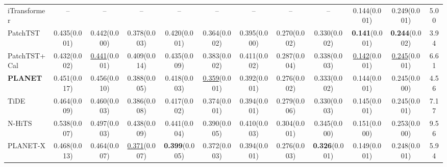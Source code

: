 \begin{table}[!t]
\begin{adjustbox}{max width=\linewidth}
\begin{tabular}{lccccccccccc}
iTransformer & -- & -- & -- & -- & -- & -- & -- & -- & 0.144{\scriptsize\color{gray}(0.001)} & 0.249{\scriptsize\color{gray}(0.001)} & 5.00 \\
PatchTST & 0.435{\scriptsize\color{gray}(0.001)} & 0.442{\scriptsize\color{gray}(0.000)} & 0.378{\scriptsize\color{gray}(0.003)} & 0.420{\scriptsize\color{gray}(0.001)} & 0.364{\scriptsize\color{gray}(0.002)} & 0.395{\scriptsize\color{gray}(0.000)} & 0.270{\scriptsize\color{gray}(0.002)} & 0.330{\scriptsize\color{gray}(0.002)} & \textbf{0.141}{\scriptsize\color{gray}(0.001)} & \textbf{0.244}{\scriptsize\color{gray}(0.002)} & 3.94 \\
PatchTST+Cal & 0.432{\scriptsize\color{gray}(0.002)} & \underline{0.441}{\scriptsize\color{gray}(0.001)} & 0.409{\scriptsize\color{gray}(0.014)} & 0.435{\scriptsize\color{gray}(0.009)} & 0.383{\scriptsize\color{gray}(0.002)} & 0.411{\scriptsize\color{gray}(0.002)} & 0.287{\scriptsize\color{gray}(0.004)} & 0.338{\scriptsize\color{gray}(0.003)} & \underline{0.142}{\scriptsize\color{gray}(0.001)} & \underline{0.245}{\scriptsize\color{gray}(0.001)} & 6.61 \\
\textbf{PLANET} & 0.451{\scriptsize\color{gray}(0.017)} & 0.456{\scriptsize\color{gray}(0.010)} & 0.388{\scriptsize\color{gray}(0.005)} & 0.418{\scriptsize\color{gray}(0.003)} & \underline{0.359}{\scriptsize\color{gray}(0.001)} & 0.392{\scriptsize\color{gray}(0.001)} & 0.276{\scriptsize\color{gray}(0.002)} & 0.333{\scriptsize\color{gray}(0.002)} & 0.144{\scriptsize\color{gray}(0.001)} & 0.245{\scriptsize\color{gray}(0.000)} & 4.56 \\
TiDE & 0.464{\scriptsize\color{gray}(0.009)} & 0.460{\scriptsize\color{gray}(0.003)} & 0.386{\scriptsize\color{gray}(0.008)} & 0.417{\scriptsize\color{gray}(0.002)} & 0.374{\scriptsize\color{gray}(0.001)} & 0.394{\scriptsize\color{gray}(0.001)} & 0.279{\scriptsize\color{gray}(0.006)} & 0.330{\scriptsize\color{gray}(0.003)} & 0.145{\scriptsize\color{gray}(0.001)} & 0.245{\scriptsize\color{gray}(0.001)} & 7.17 \\
N-HiTS & 0.538{\scriptsize\color{gray}(0.007)} & 0.497{\scriptsize\color{gray}(0.003)} & 0.438{\scriptsize\color{gray}(0.009)} & 0.441{\scriptsize\color{gray}(0.004)} & 0.390{\scriptsize\color{gray}(0.005)} & 0.410{\scriptsize\color{gray}(0.003)} & 0.304{\scriptsize\color{gray}(0.001)} & 0.345{\scriptsize\color{gray}(0.000)} & 0.151{\scriptsize\color{gray}(0.000)} & 0.253{\scriptsize\color{gray}(0.000)} & 9.56 \\
PLANET-X & 0.468{\scriptsize\color{gray}(0.013)} & 0.464{\scriptsize\color{gray}(0.007)} & \underline{0.371}{\scriptsize\color{gray}(0.007)} & \textbf{0.399}{\scriptsize\color{gray}(0.005)} & 0.372{\scriptsize\color{gray}(0.003)} & 0.394{\scriptsize\color{gray}(0.001)} & 0.276{\scriptsize\color{gray}(0.003)} & \textbf{0.326}{\scriptsize\color{gray}(0.001)} & 0.149{\scriptsize\color{gray}(0.001)} & 0.248{\scriptsize\color{gray}(0.001)} & 5.94 \\
\bottomrule
\end{tabular}
\end{adjustbox}
\end{table}
